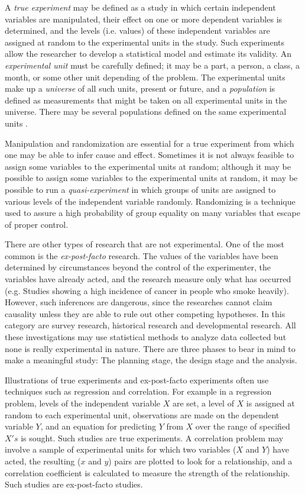 \documentclass{WileySev}
\newcommand{\myexample}[2]{
    \begin{tcolorbox}[enhanced,colback=black!5!white,colframe=black,sharp corners,title={Example: #1}]#2
    \end{tcolorbox}
}
\begin{document}
A \textit{true experiment} may be defined as a study in which certain independent variables are manipulated, their effect on one or more dependent variables is determined, and the levels (i.e. values) of these independent variables are assigned at random to the experimental units in the study. Such experiments allow the researcher to develop a statistical model and estimate its validity. An \textit{experimental unit} must be carefully defined; it may be a part, a person, a class, a month, or some other unit depending of the problem. The experimental units make up a \textit{universe} of all such units, present or future, and a \textit{population} is defined as measurements that might be taken on all experimental units in the universe. There may be several populations defined on the same experimental units \cite{hicks1999fundamental}.

Manipulation and randomization are essential for a true experiment from which one may be able to infer cause and effect. Sometimes it is not always feasible to assign some variables to the experimental units at random; although it may be possible to assign some variables to the experimental units at random, it may be possible to run a \textit{quasi-experiment} in which groups of units are assigned to various levels of the independent variable randomly. Randomizing is a technique used to assure a high probability of group equality on many variables that escape of proper control.

There are other types of research that are not experimental. One of the most common is the \textit{ex-post-facto} research. The values of the variables have been determined by circumstances beyond the control of the experimenter, the variables have already acted, and the research measure only what has occurred (e.g. Studies showing a high incidence of cancer in people who smoke heavily). However, such inferences are dangerous, since the researches cannot claim causality unless they are able to rule out other competing hypotheses. In this category are survey research, historical research and developmental research. All these investigations may use statistical methods to analyze data collected but none is really experimental in nature. There are three phases to bear in mind to make a meaningful study: The planning stage, the design stage and the analysis.
\\
\myexample{Experimental Designs}{Illustrations of true experiments and ex-post-facto experiments often use techniques such as regression and correlation. For example in a regression problem, levels of the independent variable $X$ are set, a level of $X$ is assigned at random to each experimental unit, observations are made on the dependent variable $Y$, and an equation for predicting $Y$ from $X$ over the range of specified $X's$ is sought. Such studies are true experiments.
A correlation problem may involve a sample of experimental units for which two variables ($X$ and $Y$) have acted, the resulting ($x$ and $y$) pairs are plotted to look for a relationship, and a correlation coefficient is calculated to measure the strength of the relationship. Such studies are ex-post-facto studies.}
\end{document}
